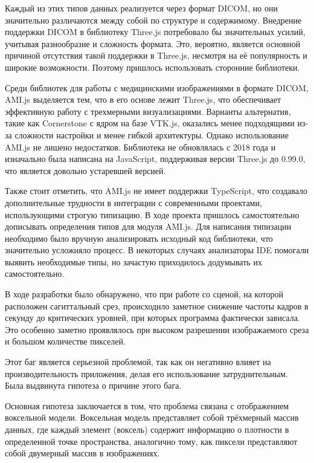 Каждый из этих типов данных реализуется через формат DICOM, но они значительно различаются между собой по структуре и содержимому. Внедрение поддержки DICOM в библиотеку Three.js потребовало бы значительных усилий, учитывая разнообразие и сложность формата. Это, вероятно, является основной причиной отсутствия такой поддержки в Three.js, несмотря на её популярность и широкие возможности. Поэтому пришлось использовать сторонние библиотеки.

Среди библиотек для работы с медицинскими изображениями в формате DICOM, AMI.js выделяется тем, что в его основе лежит Three.js, что обеспечивает эффективную работу с трехмерными визуализациями. Варианты альтернатив, такие как Cornerstone с ядром на базе VTK.js, оказались менее подходящими из-за сложности настройки и менее гибкой архитектуры. Однако использование AMI.js не лишено недостатков. Библиотека не обновлялась с 2018 года и изначально была написана на JavaScript, поддерживая версии Three.js до 0.99.0, что является довольно устаревшей версией.

Также стоит отметить, что AMI.js не имеет поддержки TypeScript, что создавало дополнительные трудности в интеграции с современными проектами, использующими строгую типизацию. В ходе проекта пришлось самостоятельно дописывать определения типов для модуля AMI.js. Для написания типизации необходимо было вручную анализировать исходный код библиотеки, что значительно усложняло процесс. В некоторых случаях анализаторы IDE помогали выявить необходимые типы, но зачастую приходилось додумывать их самостоятельно.

В ходе разработки было обнаружено, что при работе со сценой, на которой расположен сагиттальный срез, происходило заметное снижение частоты кадров в секунду до критических уровней, при которых программа фактически зависала. Это особенно заметно проявлялось при высоком разрешении изображаемого среза и большом количестве пикселей.

Этот баг является серьезной проблемой, так как он негативно влияет на производительность приложения, делая его использование затруднительным. Была выдвинута гипотеза о причине этого бага.

Основная гипотеза заключается в том, что проблема связана с отображением воксельной модели. Воксельная модель представляет собой трёхмерный массив данных, где каждый элемент (воксель) содержит информацию о плотности в определенной точке пространства, аналогично тому, как пиксели представляют собой двумерный массив в изображениях.

